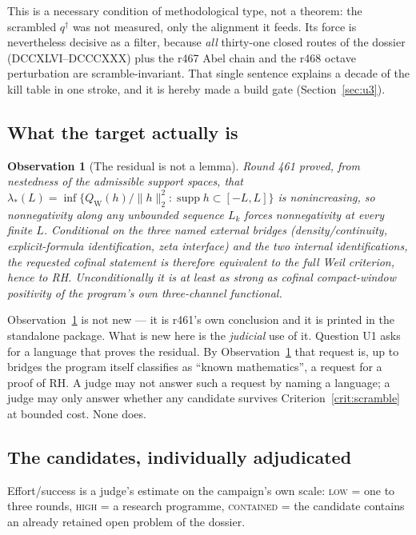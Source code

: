 \documentclass[11pt]{article}
\newtheorem{observation}{Observation}
\theoremstyle{remark}
\newcommand{\qdag}{q^{\dagger}}
\begin{document}
This is a necessary condition of methodological type, not a theorem:
the scrambled $\qdag$ was not measured, only the alignment it feeds.
Its force is nevertheless decisive as a filter, because
\emph{all} thirty-one closed routes of the dossier
(DCCXLVI--DCCCXXX) plus the r467 Abel chain and the r468 octave
perturbation are scramble-invariant.  That single sentence explains
a decade of the kill table in one stroke, and it is hereby made a
build gate (Section~\ref{sec:u3}).

\subsection{What the target actually is}

\begin{observation}[The residual is not a lemma]\label{obs:rh}
Round 461 proved, from nestedness of the admissible support spaces,
that $\lambda_*(L)=\inf\{Q_{\mathrm W}(h)/\|h\|_2^2:
\operatorname{supp}h\subset[-L,L]\}$ is nonincreasing, so
nonnegativity along \emph{any} unbounded sequence $L_k$ forces
nonnegativity at every finite $L$.  Conditional on the three named
external bridges (density/continuity, explicit-formula
identification, zeta interface) and the two internal identifications,
the requested cofinal statement is therefore equivalent to the full
Weil criterion, hence to RH.  Unconditionally it is at least as
strong as cofinal compact-window positivity of the program's own
three-channel functional.
\end{observation}

Observation~\ref{obs:rh} is not new --- it is r461's own conclusion
and it is printed in the standalone package.  What is new here is the
\emph{judicial} use of it.  Question U1 asks for a language that
proves the residual.  By Observation~\ref{obs:rh} that request is,
up to bridges the program itself classifies as ``known mathematics'',
a request for a proof of RH.  A judge may not answer such a request
by naming a language; a judge may only answer whether any candidate
survives Criterion~\ref{crit:scramble} at bounded cost.  None does.

\subsection{The candidates, individually adjudicated}

Effort/success is a judge's estimate on the campaign's own scale:
\textsc{low} = one to three rounds, \textsc{high} = a research
programme, \textsc{contained} = the candidate contains an already
retained open problem of the dossier.
\end{document}
